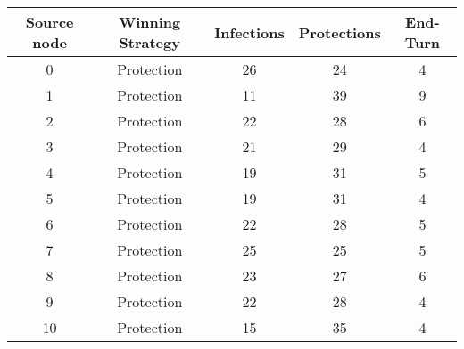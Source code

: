 \documentclass[results.tex]{subfiles}
\begin{document}
    \begin{center}
        \begin{tabular}{| c || c | c | c | c |}
            \hline
            {\bfseries Source node} & {\bfseries Winning Strategy} & {\bfseries Infections} & {\bfseries Protections}
            & {\bfseries End-Turn}
            \\  %
            \hline\hline
            0                       & Protection                   & 26                     & 24                      & 4                    \\
            \hline
            1                       & Protection                   & 11                     & 39                      & 9                    \\
            \hline
            2                       & Protection                   & 22                     & 28                      & 6                    \\
            \hline
            3                       & Protection                   & 21                     & 29                      & 4                    \\
            \hline
            4                       & Protection                   & 19                     & 31                      & 5                    \\
            \hline
            5                       & Protection                   & 19                     & 31                      & 4                    \\
            \hline
            6                       & Protection                   & 22                     & 28                      & 5                    \\
            \hline
            7                       & Protection                   & 25                     & 25                      & 5                    \\
            \hline
            8                       & Protection                   & 23                     & 27                      & 6                    \\
            \hline
            9                       & Protection                   & 22                     & 28                      & 4                    \\
            \hline
            10                      & Protection                   & 15                     & 35                      & 4                    \\

\end{tabular}
\end{center}
\end{document}
